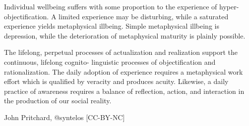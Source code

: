 Individual wellbeing suffers with some proportion to the experience of
hyper- objectification.  A limited experience may be disturbing, while
a saturated experience yields metaphysical illbeing.  Simple
metaphysical illbeing is depression, while the deterioration of
metaphysical maturity is plainly possible.

The lifelong, perpetual processes of actualization and realization
support the continuous, lifelong cognito- linguistic processes of
objectification and rationalization.  The daily adoption of experience
requires a metaphysical work effort which is qualified by veracity and
produces acuity.  Likewise, a daily practice of awareness requires a
balance of reflection, action, and interaction in the production of
our social reality.


{\tail John Pritchard, @syntelos [CC-BY-NC]}

\bye
